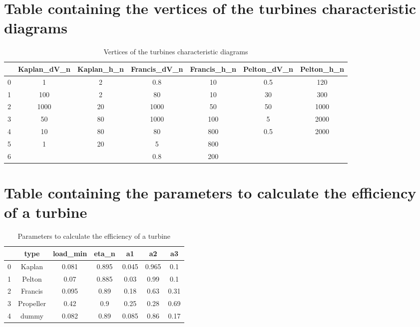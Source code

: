 \section{Table containing the vertices of the turbines characteristic diagrams}
\label{app:csv_vertices}
\begin{table}[H]
\footnotesize
 \centering
 \caption{Vertices of the turbines characteristic diagrams}
 \begin{tabular}{|c|c|c|c|c|c|c|}
 \cline{2-7}
  \multicolumn{1}{c|}{}&Kaplan{\_}dV{\_}n&Kaplan{\_}h{\_}n&Francis{\_}dV{\_}n&Francis{\_}h{\_}n&Pelton{\_}dV{\_}n&Pelton{\_}h{\_}n\\
  \hline
  0&1&2&0.8&10&0.5&120\\
  1&100&2&80&10&30&300\\
  2&1000&20&1000&50&50&1000\\
  3&50&80&1000&100&5&2000\\
  4&10&80&80&800&0.5&2000\\
  5&1&20&5&800&&\\
  6&&&0.8&200&&\\
  \hline
 \end{tabular}
\end{table}

\section{Table containing the parameters to calculate the efficiency of a turbine}
\label{app:csv_eff}
\begin{table}[H]
\footnotesize
 \centering
 \caption{Parameters to calculate the efficiency of a turbine}
 \begin{tabular}{|c|c|c|c|c|c|c|}
 \cline{2-7}
  \multicolumn{1}{c|}{}&type&load{\_}min&eta{\_}n&a1&a2&a3\\
  \hline
0&Kaplan&0.081&0.895&0.045&0.965&0.1\\
1&Pelton&0.07&0.885&0.03&0.99&0.1\\
2&Francis&0.095&0.89&0.18&0.63&0.31\\
3&Propeller&0.42&0.9&0.25&0.28&0.69\\
4&dummy&0.082&0.89&0.085&0.86&0.17\\
  \hline
 \end{tabular}
\end{table}

